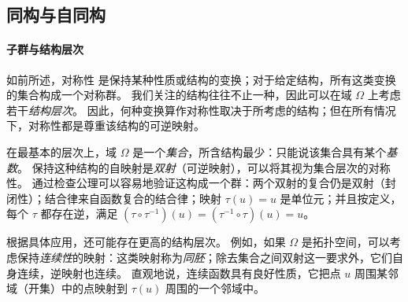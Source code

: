 



\subsection{同构与自同构}
\label{sec:isomorphism}

\paragraph{子群与结构层次}

如前所述，对称性
是保持某种性质或结构的变换；对于给定结构，所有这类变换的集合构成一个对称群。
我们关注的结构往往不止一种，因此可以在域 $\Omega$ 上考虑若干{\em 结构层次}。
%
因此，何种变换算作对称性取决于所考虑的结构；但在所有情况下，对称性都是尊重该结构的可逆映射。

在最基本的层次上，域 $\Omega$ 是一个\emph{集合}，所含结构最少：只能说该集合具有某个\emph{基数}。%
保持这种结构的自映射是\emph{双射}（可逆映射），可以将其视为集合层次的对称性。
%
通过检查公理可以容易地验证这构成一个群：两个双射的复合仍是双射（封闭性）；结合律来自函数复合的结合律；映射 $\tau(u)=u$ 是单位元；并且按定义，每个 $\tau$ 都存在逆，满足 $(\tau \circ \tau^{-1})(u) = (\tau^{-1} \circ \tau)(u) =u$。


根据具体应用，还可能存在更高的结构层次。
%
例如，如果 $\Omega$ 是拓扑空间，可以考虑保持{\em 连续性}的映射：这类映射称为{\em 同胚}；除去集合之间双射这一要求外，它们自身连续，逆映射也连续。
%
直观地说，连续函数具有良好性质，它把点 $u$ 周围某邻域（开集）中的点映射到 $\tau(u)$ 周围的一个邻域中。


